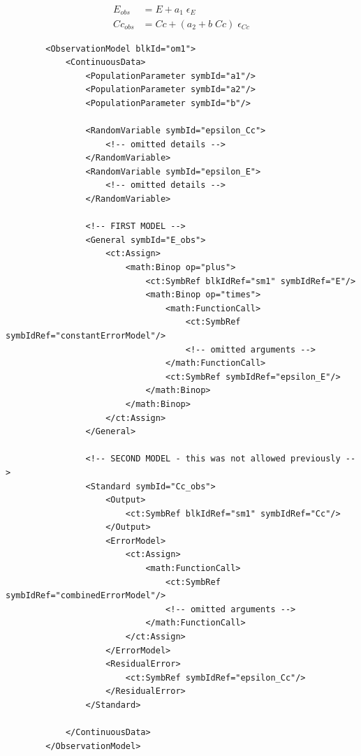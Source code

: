 \begin{align}
E_{obs} &= E + a_1 \;\epsilon_{E} \nonumber \\
Cc_{obs} &= Cc + (a_2 + b\;Cc) \;\epsilon_{Cc}  \nonumber
\end{align}


\lstset{language=XML}
\begin{lstlisting}
        <ObservationModel blkId="om1">
            <ContinuousData>
                <PopulationParameter symbId="a1"/>
                <PopulationParameter symbId="a2"/>
                <PopulationParameter symbId="b"/>

                <RandomVariable symbId="epsilon_Cc">
                    <!-- omitted details -->
                </RandomVariable>
                <RandomVariable symbId="epsilon_E">
                    <!-- omitted details -->
                </RandomVariable>
                
                <!-- FIRST MODEL -->
                <General symbId="E_obs">
                    <ct:Assign>
                        <math:Binop op="plus">
                            <ct:SymbRef blkIdRef="sm1" symbIdRef="E"/>
                            <math:Binop op="times">
                                <math:FunctionCall>
                                    <ct:SymbRef symbIdRef="constantErrorModel"/>
                                    <!-- omitted arguments -->
                                </math:FunctionCall>
                                <ct:SymbRef symbIdRef="epsilon_E"/>
                            </math:Binop>
                        </math:Binop>
                    </ct:Assign>
                </General>

                <!-- SECOND MODEL - this was not allowed previously -->
                <Standard symbId="Cc_obs">
                    <Output>
                        <ct:SymbRef blkIdRef="sm1" symbIdRef="Cc"/>
                    </Output>
                    <ErrorModel>
                        <ct:Assign>
                            <math:FunctionCall>
                                <ct:SymbRef symbIdRef="combinedErrorModel"/>
                                <!-- omitted arguments -->
                            </math:FunctionCall>
                        </ct:Assign>
                    </ErrorModel>
                    <ResidualError>
                        <ct:SymbRef symbIdRef="epsilon_Cc"/>
                    </ResidualError>
                </Standard>
                
            </ContinuousData>
        </ObservationModel>
\end{lstlisting}

